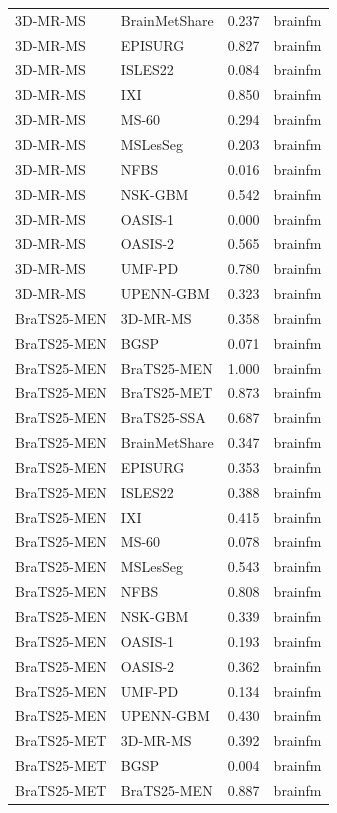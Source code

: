 \begin{tabular}{llrl}
3D-MR-MS & BrainMetShare & 0.237 & brainfm \\
3D-MR-MS & EPISURG & 0.827 & brainfm \\
3D-MR-MS & ISLES22 & 0.084 & brainfm \\
3D-MR-MS & IXI & 0.850 & brainfm \\
3D-MR-MS & MS-60 & 0.294 & brainfm \\
3D-MR-MS & MSLesSeg & 0.203 & brainfm \\
3D-MR-MS & NFBS & 0.016 & brainfm \\
3D-MR-MS & NSK-GBM & 0.542 & brainfm \\
3D-MR-MS & OASIS-1 & 0.000 & brainfm \\
3D-MR-MS & OASIS-2 & 0.565 & brainfm \\
3D-MR-MS & UMF-PD & 0.780 & brainfm \\
3D-MR-MS & UPENN-GBM & 0.323 & brainfm \\
BraTS25-MEN & 3D-MR-MS & 0.358 & brainfm \\
BraTS25-MEN & BGSP & 0.071 & brainfm \\
BraTS25-MEN & BraTS25-MEN & 1.000 & brainfm \\
BraTS25-MEN & BraTS25-MET & 0.873 & brainfm \\
BraTS25-MEN & BraTS25-SSA & 0.687 & brainfm \\
BraTS25-MEN & BrainMetShare & 0.347 & brainfm \\
BraTS25-MEN & EPISURG & 0.353 & brainfm \\
BraTS25-MEN & ISLES22 & 0.388 & brainfm \\
BraTS25-MEN & IXI & 0.415 & brainfm \\
BraTS25-MEN & MS-60 & 0.078 & brainfm \\
BraTS25-MEN & MSLesSeg & 0.543 & brainfm \\
BraTS25-MEN & NFBS & 0.808 & brainfm \\
BraTS25-MEN & NSK-GBM & 0.339 & brainfm \\
BraTS25-MEN & OASIS-1 & 0.193 & brainfm \\
BraTS25-MEN & OASIS-2 & 0.362 & brainfm \\
BraTS25-MEN & UMF-PD & 0.134 & brainfm \\
BraTS25-MEN & UPENN-GBM & 0.430 & brainfm \\
BraTS25-MET & 3D-MR-MS & 0.392 & brainfm \\
BraTS25-MET & BGSP & 0.004 & brainfm \\
BraTS25-MET & BraTS25-MEN & 0.887 & brainfm \\

\end{tabular}
